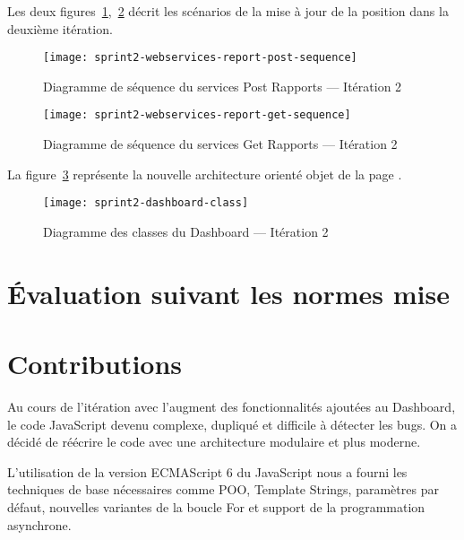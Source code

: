 Les deux
figures~\ref{fig:sprint2-webservices-report-post-sequence},~\ref{fig:sprint2-webservices-report-get-sequence}
décrit les scénarios de la mise à jour de la position dans la deuxième
itération.

\begin{figure}[htbp]
    \centering
    \texttt{[image: sprint2-webservices-report-post-sequence]}
    \caption{Diagramme de séquence du services Post Rapports --- Itération 2}
\label{fig:sprint2-webservices-report-post-sequence}
\end{figure}

\begin{figure}[htbp]
    \centering
    \texttt{[image: sprint2-webservices-report-get-sequence]}
    \caption{Diagramme de séquence du services Get Rapports --- Itération 2}
\label{fig:sprint2-webservices-report-get-sequence}
\end{figure}

La figure~\ref{fig:sprint2-dashboard-class} représente la nouvelle architecture
orienté objet de la page .

\begin{figure}[htbp]
    \centering
    \texttt{[image: sprint2-dashboard-class]}
    \caption{Diagramme des classes du Dashboard --- Itération 2}
\label{fig:sprint2-dashboard-class}
\end{figure}

\section{Évaluation suivant les normes mise}


\section{Contributions}

Au cours de l'itération avec l'augment des fonctionnalités ajoutées au
Dashboard, le code JavaScript devenu complexe, dupliqué et difficile à détecter
les bugs. On a décidé de réécrire le code avec une architecture modulaire et
plus moderne.

L'utilisation de la version ECMAScript 6 du JavaScript nous a fourni les
techniques de base nécessaires comme POO, Template Strings, paramètres par
défaut, nouvelles variantes de la boucle For et support de la programmation
asynchrone.

